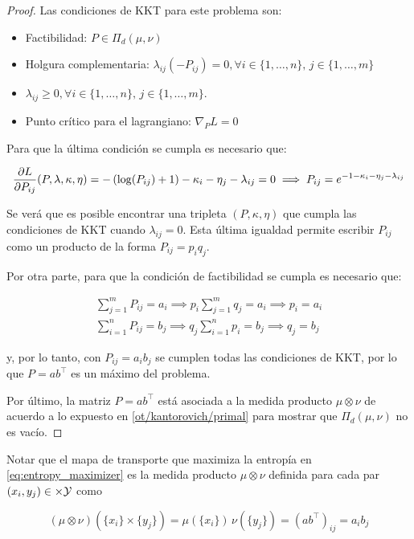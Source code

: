 \begin{proof}
	Las condiciones de KKT para este problema son:

	\begin{itemize}
		\item Factibilidad: $P \in\Pi_d(\mu,\nu)$
		\item Holgura complementaria: $\lambda_{ij}(-P_{ij})=0, \forall i\in\{1,\ldots,n\},\, j\in\{1,\ldots,m\}$
		\item $\lambda_{ij}\geq 0, \forall i\in\{1,\ldots,n\},\, j\in\{1,\ldots,m\}$.
		\item Punto crítico para el lagrangiano: $\nabla_P L = 0$
	\end{itemize}

	Para que la última condición se cumpla es necesario que:

	\begin{equation}
		\frac{\partial L}{\partial P_{ij}}(P,\lambda,\kappa,\eta) = -\left(\log(P_{ij})+1\right) - \kappa_i - \eta_j - \lambda_{ij} = 0 \implies P_{ij} = e^{-1 - \kappa_i - \eta_j - \lambda_{ij}}
	\end{equation}

	Se verá que es posible encontrar una tripleta $(P,\kappa,\eta)$ que cumpla las condiciones de KKT cuando $\lambda_{ij}=0$. Esta última igualdad permite escribir $P_{ij}$ como un producto de la forma $P_{ij} = p_i q_j$.

	Por otra parte, para que la condición de factibilidad se cumpla es necesario que:

	\begin{align}
		\sum_{j=1}^m P_{ij} = a_i \implies p_i \sum_{j=1}^m q_j = a_i \implies p_i = a_i \\
		\sum_{i=1}^n P_{ij} = b_j \implies q_j \sum_{i=1}^n p_i = b_j \implies q_j = b_j
	\end{align}

	y, por lo tanto, con $P_{ij} = a_i b_j$ se cumplen todas las condiciones de KKT, por lo que $P=ab^\top$ es un máximo del problema.

	Por último, la matriz $P=ab^\top$ está asociada a la medida producto $\mu\otimes\nu$ de acuerdo a lo expuesto en \autoref{ot/kantorovich/primal} para mostrar que $\Pi_d(\mu,\nu)$ no es vacío.
\end{proof}

Notar que el mapa de transporte que maximiza la entropía en \eqref{eq:entropy_maximizer} es la medida producto $\mu\otimes\nu$ definida para cada par $(x_i,y_j)\in\times\mathcal{Y}$ como

\begin{equation}
	(\mu\otimes\nu)(\{x_i\}\times\{y_j\}) = \mu(\{x_i\})\,\nu(\{y_j\}) = (ab^\top)_{ij} = a_i b_j
\end{equation}

